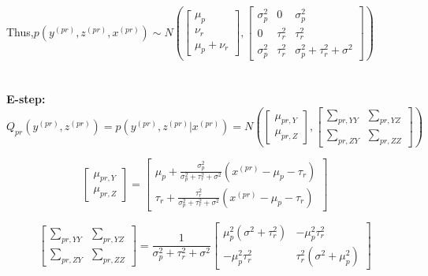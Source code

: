 \documentclass{article}
\theoremstyle{definition}
\theoremstyle{definition}
\theoremstyle{remark}
\begin{document}
Thus,$p(y^{(pr)}, z^{(pr)}, x^{(pr)})\sim N(\begin{bmatrix}\mu_p\\\nu_r\\\mu_p+\nu_r\end{bmatrix},\begin{bmatrix}\sigma_p^2&0&\sigma_p^2\\
0&\tau_r^2&\tau_r^2\\ \sigma_p^2&\tau_r^2&\sigma_p^2+\tau_r^2+\sigma^2\end{bmatrix})$\\
\\
\\
\textbf{E-step:}\\
\[Q_{pr}(y^{(pr)}, z^{(pr)}) = p(y^{(pr)}, z^{(pr)}|x^{(pr)})=N(\begin{bmatrix}\mu_{pr,Y}\\\mu_{pr,Z}\end{bmatrix},\begin{bmatrix}\sum_{pr,YY}&\sum_{pr,YZ}\\
\sum_{pr,ZY}&\sum_{pr,ZZ}\end{bmatrix})\]

\begin{equation}
\begin{bmatrix}\mu_{pr,Y}\\\mu_{pr,Z}\end{bmatrix} = \begin{bmatrix}\mu_p+\frac{\sigma_p^2}{\sigma_p^2+\tau_r^2+\sigma^2}(x^{(pr)}-\mu_p-\tau_r)\\
\tau_r+\frac{\tau_r^2}{\sigma_p^2+\tau_r^2+\sigma^2}(x^{(pr)}-\mu_p-\tau_r)\end{bmatrix}
\end{equation}

\begin{equation}
\begin{bmatrix}\sum_{pr,YY}&\sum_{pr,YZ}\\
\sum_{pr,ZY}&\sum_{pr,ZZ}\end{bmatrix} = \frac{1}{\sigma_p^2+\tau_r^2+\sigma^2} \begin{bmatrix}\mu_p^2(\sigma^2+\tau_r^2)&-\mu_p^2\tau_r^2\\
- \mu_p^2\tau_r^2&\tau_r^2(\sigma^2+\mu_p^2)\end{bmatrix}
\end{equation}
\end{document}
